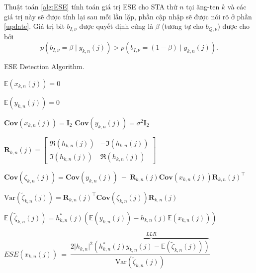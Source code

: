 Thuật toán \ref{alg:ESE} tính toán giá trị ESE cho STA thứ $n$ tại ăng-ten $k$ và các giá trị này sẽ được tính lại sau mỗi lần lặp, phần cập nhập sẽ được nói rõ ở phần \ref{update}.
Giá trị bit $b_{I,\nu}$ được quyết định cứng là $\beta$ (tương tự cho $b_{Q,\nu}$) được cho bởi
\begin{equation}
	p(b_{I,\nu} = \beta \mid y_{k,n}(j)) > p(b_{I,\nu} = (1-\beta) \mid y_{k,n}(j)). \label{eq:4}
\end{equation}

\begin{algorithm}
	\caption{ESE Detection Algorithm.}\label{alg:ESE}
	\begin{algorithmic}[1]

		\State $\mathbb{E}(x_{k,n}(j)) = 0$     

		\State $\mathbb{E}(y_{k,n}(j)) = 0$

		\State $\textbf{Cov}(x_{k,n}(j)) = \textbf{I}_2$
		\State $\textbf{Cov}(y_{k,n}(j)) = \sigma^2\textbf{I}_2$

		\State $\textbf{R}_{k,n}(j)=
			\begin{bmatrix}
				\Re(h_{k,n}(j)) & -\Im(h_{k,n}(j)) \\
				\Im(h_{k,n}(j)) & \Re(h_{k,n}(j))
			\end{bmatrix}$

		\State $\textbf{Cov}(\zeta_{k,n}(j))=\textbf{Cov}(y_{k,n}(j))~-~\textbf{R}_{k,n}(j)\textbf{Cov}(x_{k,n}(j)) \textbf{R}_{k,n}(j)^\top$

		\State $\text{Var}(\tilde{\zeta}_{k,n}(j)) = \textbf{R}_{k,n}(j)^\top \textbf{Cov}(\zeta_{k,n}(j)) \textbf{R}_{k,n}(j)$

		\State $\mathbb{E}(\tilde{\zeta}_{k,n}(j)) = h_{k,n}^{*}(j)(\mathbb{E}(y_{k,n}(j)) - h_{k,n}(j) \mathbb{E}(x_{k,n}(j)))$

		\State $ESE(x_{k,n}(j))~=~\dfrac{2\lvert h_{k,n}\rvert^2\overbrace{(h_{k,n}^{*}(j) y_{k,n}(j) - \mathbb{E}(\tilde{\zeta}_{k,n}(j)))}^{LLR}}{\text{Var}(\tilde{\zeta}_{k,n}(j))}$                                  


		\EndProcedure
	\end{algorithmic}
\end{algorithm}


